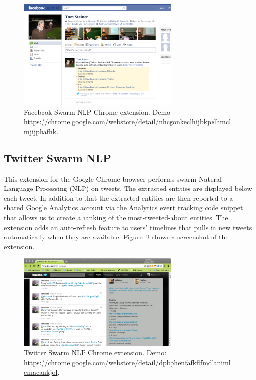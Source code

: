 \documentclass[12pt]{article}
\begin{document}
\begin{figure}[htbp!]
\begin{center}
    \includegraphics[width=0.7\textwidth]{./resources/facebook-swarm-nlp.png}
    \caption[Facebook Swarm NLP Chrome extension.]{Facebook Swarm NLP Chrome extension. Demo: \url{https://chrome.google.com/webstore/detail/nhcgonkeclhijbkpelhmclmjijphafhk}.} 
  \label{fig:facebook-swarm-nlp}
  \end{center}  
\end{figure}

\subsection{Twitter Swarm NLP}\label{tw-swarm}
This extension for the Google Chrome browser performs swarm Natural Language Processing (NLP) on tweets. The extracted entities are displayed below each tweet. In addition to that the extracted entities are then reported to a shared Google Analytics account via the Analytics event tracking code snippet that allows us to create a ranking of the most-tweeted-about entities. The extension adds an auto-refresh feature to users' timelines that pulls in new tweets automatically when they are available. Figure~\ref{fig:twitter-swarm-nlp} shows a screenshot of the extension.

\begin{figure}[htbp!]
\begin{center}
    \includegraphics[width=0.7\textwidth]{./resources/twitter-swarm-nlp.png}
    \caption[Twitter Swarm NLP Chrome extension.]{Twitter Swarm NLP Chrome extension. Demo: \url{https://chrome.google.com/webstore/detail/dpbphenfafkflfmdlanimlemacankjol}.}
  \label{fig:twitter-swarm-nlp}
  \end{center}  
\end{figure}
\end{document}
